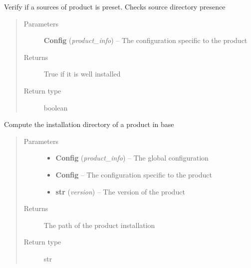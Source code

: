 \documentclass[a4paper,10pt,english]{sphinxmanual}
\begin{document}

\begin{fulllineitems}
\label{commands/apidoc/src:src.product.check_source}
Verify if a sources of product is preset. Checks source directory presence
\begin{quote}\begin{description}
\item[{Parameters}] \leavevmode
\textbf{Config} (\emph{product\_info}) -- The configuration specific to 
the product

\item[{Returns}] \leavevmode
True if it is well installed

\item[{Return type}] \leavevmode
boolean

\end{description}\end{quote}

\end{fulllineitems}


\begin{fulllineitems}
\label{commands/apidoc/src:src.product.get_base_install_dir}
Compute the installation directory of a product in base
\begin{quote}\begin{description}
\item[{Parameters}] \leavevmode\begin{itemize}
\item {} 
\textbf{Config} (\emph{product\_info}) -- The global configuration

\item {} 
\textbf{Config} -- The configuration specific to 
the product

\item {} 
\textbf{str} (\emph{version}) -- The version of the product

\end{itemize}

\item[{Returns}] \leavevmode
The path of the product installation

\item[{Return type}] \leavevmode
str

\end{description}\end{quote}

\end{fulllineitems}
\end{document}
